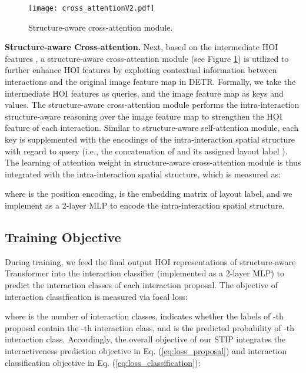 \documentclass[10pt,twocolumn,letterpaper]{article}
\begin{document}
\begin{figure}[t]
\vspace{-0.35in}
\begin{center}
   \texttt{[image: cross\_attentionV2.pdf]}
\end{center}
\vspace{-0.3in}
   \caption{Structure-aware cross-attention module.}
   \vspace{-0.26in}
\label{fig:cross-attention}
\end{figure}

\textbf{Structure-aware Cross-attention.}
Next, based on the intermediate HOI features , a structure-aware cross-attention module (see Figure \ref{fig:cross-attention}) is utilized to further enhance HOI features by exploiting contextual information between interactions and the original image feature map in DETR. Formally, we take the  intermediate HOI features  as queries, and the image feature map  as keys and values. The structure-aware cross-attention module performs the intra-interaction structure-aware reasoning over the image feature map to strengthen the HOI feature of each interaction. Similar to structure-aware self-attention module, each key  is supplemented with the encodings of the intra-interaction spatial structure with regard to query  (i.e., the concatenation of  and its assigned layout label ). The learning of attention weight in structure-aware cross-attention module is thus integrated with the intra-interaction spatial structure, which is measured as:

where  is the position encoding,  is the embedding matrix of layout label, and we implement  as a 2-layer MLP to encode the intra-interaction spatial structure.

\subsection{Training Objective}
During training, we feed the final output HOI representations of structure-aware Transformer into the interaction classifier (implemented as a 2-layer MLP) to predict the interaction classes of each interaction proposal. The objective of interaction classification is measured via focal loss:

where  is the number of interaction classes,  indicates whether the labels of -th proposal contain the -th interaction class, and  is the predicted probability of -th interaction class. Accordingly, the overall objective of our STIP integrates the interactiveness prediction objective in Eq. (\ref{eq:loss_proposal}) and interaction classification objective in Eq. (\ref{eq:loss_classification}):
\end{document}
